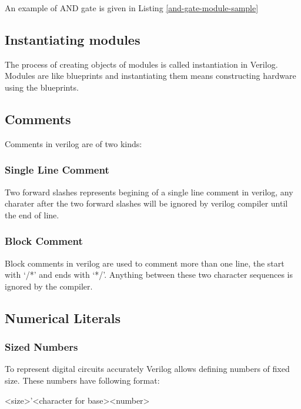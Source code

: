 \documentclass[a4paper,10pt]{article}
\theoremstyle{mytheor}
\newcommand{
  \insertverilog}[3]{
  
}
\begin{document}
\insertverilog{./verilog_files/module.v}{sample-module-bare}{\text{Sample module indicating its structure}}

An example of AND gate is given in Listing \ref{and-gate-module-sample}
\insertverilog{./verilog_files/andGate.v}{and-gate-module-sample}{\text{Illustrative AND gate module}}

\subsection*{Instantiating modules}
The process of creating objects of modules is called instantiation in Verilog. Modules are like blueprints and instantiating them means constructing hardware using the blueprints.
  
\insertverilog{./verilog_files/AndGate3.v}{sample-module}{\text{Illustrative AND gate module}} 
\subsection*{Comments}
Comments in verilog are of two kinds:
\subsubsection*{Single Line Comment}
Two forward slashes represents begining of a single line comment in verilog, any charater after the two forward slashes will be ignored by verilog compiler until the end of line.
\insertverilog{./verilog_files/singleLineComment.v}{single-line-comment}{\text{Single line comment}} 

\subsubsection*{Block Comment}
Block comments in verilog are used to comment more than one line, the start with `/*' and ends with `*/'. Anything between these two character sequences is ignored by the compiler.
\insertverilog{./verilog_files/blockComment.v}{block-comment}{\text{Block
    comment}}

\subsection*{Numerical Literals}
\subsubsection*{Sized Numbers}
To represent digital circuits accurately Verilog allows defining
numbers of fixed size. These numbers have following format:
\begin{center}
  <size>'<character for base><number>
\end{center}
\end{document}
